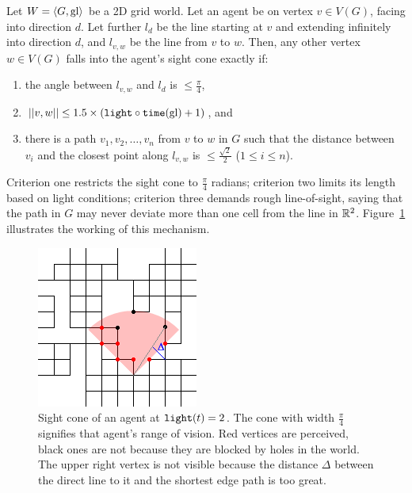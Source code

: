 \begin{definition}
	Let $W = \langle G, \mathrm{gl} \rangle$ be a 2D grid world. Let an agent be on vertex $v \in V(G)$, facing into direction $d$. Let further $l_d$ be the line starting at $v$ and extending infinitely into direction $d$, and $l_{v,w}$ be the line from $v$ to $w$. Then, any other vertex $w \in V(G)$ falls into the agent's sight cone exactly if:
	
	\begin{enumerate}
		\item the angle between $l_{v,w}$ and $l_d$ is $\leq \frac{\pi}{4}$,
		\item $||{v},{w}|| \leq 1.5 \times (\mathtt{light} \circ \mathtt{time} (\mathrm{gl}) + 1)$, and
		\item there is a path $v_1, v_2, \dots, v_n$ from $v$ to $w$ in $G$ such that
		the distance between $v_i$ and the closest point along $l_{v,w}$ is $\leq \frac{\sqrt{2}}{2}$ ($1 \leq i \leq n$).
	\end{enumerate}
\end{definition}

Criterion one restricts the sight cone to $\frac{\pi}{4}$ radians; criterion two limits its length based on light conditions; criterion three demands rough line-of-sight, saying that the path in $G$ may never deviate more than one cell from the line in $\mathbb{R}^2$. Figure~\ref{fig:los} illustrates the working of this mechanism.

\begin{figure}
	\centering
	\includegraphics{figs/los.png}
	\caption{Sight cone of an agent at $\mathtt{light}(t) = 2$. The cone with width $\frac{\pi}{4}$ signifies that agent's range of vision. Red vertices are perceived, black ones are not because they are blocked by holes in the world. The upper right vertex is not visible because the distance $\Delta$ between the direct line to it and the shortest edge path is too great.}
	\label{fig:los}
\end{figure}

